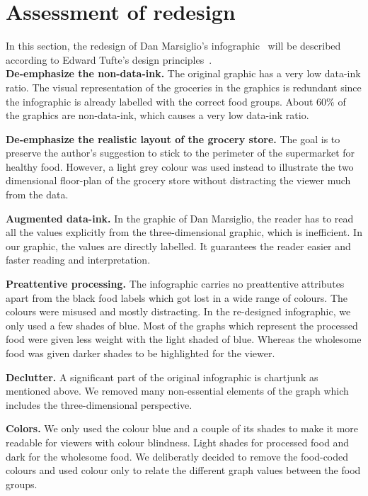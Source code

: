 \section{Assessment of redesign}

In this section, the redesign of Dan Marsiglio's
infographic~\cite{DanMarsiglio2008} will be described according to Edward
Tufte's design principles~\cite{Tufte2001}.\\

\textbf{De-emphasize the non-data-ink.} The original graphic has a very low
data-ink ratio. The visual representation of the groceries in the graphics is
redundant since the infographic is already labelled with the correct food
groups. About 60\% of the graphics are non-data-ink, which causes a very low
data-ink ratio.

\textbf{De-emphasize the realistic layout of the grocery store.} The goal is to
preserve the author's suggestion to stick to the perimeter of the supermarket
for healthy food. However, a light grey colour was used instead to illustrate
the two dimensional floor-plan of the grocery store without distracting the
viewer much from the data.

\textbf{Augmented data-ink.} In the graphic of Dan Marsiglio, the reader has to
read all the values explicitly from the three-dimensional graphic, which is
inefficient. In our graphic, the values are directly labelled. It guarantees the
reader easier and faster reading and interpretation.

\textbf{Preattentive processing.} The infographic carries no preattentive
attributes apart from the black food labels which got lost in a wide range of
colours.  The colours were misused and mostly distracting. In the re-designed
infographic, we only used a few shades of blue. Most of the graphs which
represent the processed food were given less weight with the light shaded of
blue. Whereas the wholesome food was given darker shades to be highlighted for
the viewer.

\textbf{Declutter.} A significant part of the original infographic is chartjunk
as mentioned above. We removed many non-essential elements of the graph which
includes the three-dimensional perspective. 

\textbf{Colors.} We only used the colour blue and a couple of its shades to make
it more readable for viewers with colour blindness. Light shades for processed
food and dark for the wholesome food. We deliberatly decided to remove the
food-coded colours and used colour only to relate the different graph values
between the food groups.\\

